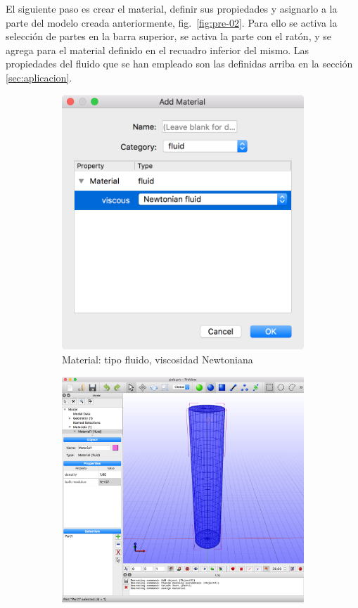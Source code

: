 El siguiente paso es crear el material, definir sus propiedades y asignarlo a la parte del modelo creada anteriormente, fig.~\ref{fig:pre-02}.
Para ello se activa la selección de partes en la barra superior, se activa la parte con el ratón, y se agrega para el material definido en el recuadro inferior del mismo.
Las propiedades del fluido que se han empleado son las definidas arriba en la sección \ref{sec:aplicacion}.
\begin{figure}[!htp]
\centering
\begin{subfigure}[b]{0.29\textwidth}
\includegraphics[width=\linewidth]{figuras_4/02_pre_mat-fluid-1.png}
\caption{Material: tipo fluido, viscosidad Newtoniana}
\label{fig:pre-02-a}
\end{subfigure}
\begin{subfigure}[b]{0.50\textwidth}
\centering
\includegraphics[width=\linewidth]{figuras_4/02_pre_mat-fluid-2.png}

\end{subfigure}
\end{figure}
